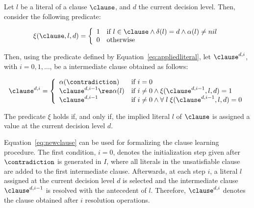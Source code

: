 \begin{definition}%
\label{def:clauselearning}
    Let $l$ be a literal of a clause $\clause$, and $d$ the current decision
    level. Then, consider the following predicate:

    \begin{equation}%
        \label{eq:appliedliteral}
        \xi(\clause, l, d) = 
        \left\{
            \begin{array}{ll}
                1 & \text{if $l \in \clause \land \delta(l) = d \land \alpha(l) \neq nil$} \\
                0 & \text{otherwise}
            \end{array}
        \right.
    \end{equation}

    Then, using the predicate defined by Equation~\ref{eq:appliedliteral}, let
    $\clause^{d,i}$, with $i = 0, 1, \ldots$, be a intermediate clause obtained
    as follows:

    \begin{equation}%
        \label{eq:newclause}
        \clause^{d,i} = 
        \left\{
            \begin{array}{ll}
                \alpha(\contradiction) & \text{if $i=0$}\\
                \clause^{d,i-1} \res \alpha(l) & \text{if $i \neq 0 \land \xi(\clause^{d,i-1}, l, d) = 1$}\\
                \clause^{d, i-1} & \text{if $i \neq 0 \land \forall\;l\;\xi(\clause^{d, i-1}, l, d) = 0$}
            \end{array}
        \right.
    \end{equation}

\end{definition}

The predicate $\xi$ holds if, and only if, the implied literal $l$ of $\clause$
is assigned a value at the current decision level $d$.   

Equation~\ref{eq:newclause} can be used for formalizing the clause learning
procedure. The first condition, $i = 0$, denotes the initialization step given
after $\contradiction$ is generated in $I$, where all literals in the
unsatisfiable
clause are added to the first intermediate clause. Afterwards, at each step $i$,
a literal $l$ assigned at the current decision level $d$ is selected and the
intermediate clause $\clause^{d, i-1}$ is resolved with the antecedent of $l$.
Therefore, $\clause^{d,i}$ denotes the clause obtained after $i$ resolution
operations.

